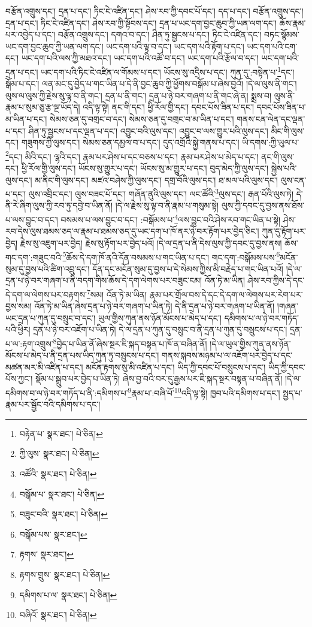 བརྩོན་འགྲུས་དང་། དྲན་པ་དང་། ཏིང་ངེ་འཛིན་དང་། ཤེས་རབ་ཀྱི་དབང་པོ་དང་། དད་པ་དང་། བརྩོན་འགྲུས་དང་། དྲན་པ་དང་། ཏིང་ངེ་འཛིན་དང་། ཤེས་རབ་ཀྱི་སྟོབས་དང་། དྲན་པ་ཡང་དག་བྱང་ཆུབ་ཀྱི་ཡན་ལག་དང་། ཆོས་རྣམ་པར་འབྱེད་པ་དང་། བརྩོན་འགྲུས་དང་། དགའ་བ་དང་། ཤིན་ཏུ་སྦྱངས་པ་དང་། ཏིང་ངེ་འཛིན་དང་། བཏང་སྙོམས་ཡང་དག་བྱང་ཆུབ་ཀྱི་ཡན་ལག་དང་། ཡང་དག་པའི་ལྟ་བ་དང་། ཡང་དག་པའི་རྟོག་པ་དང་། ཡང་དག་པའི་ངག་དང་། ཡང་དག་པའི་ལས་ཀྱི་མཐའ་དང་། ཡང་དག་པའི་འཚོ་བ་དང་། ཡང་དག་པའི་རྩོལ་བ་དང་། ཡང་དག་པའི་དྲན་པ་དང་། ཡང་དག་པའི་ཏིང་ངེ་འཛིན་ལ་གོམས་པ་དང་། ཡོངས་སུ་འདྲིས་པ་དང་། ཀུན་དུ་:བསྟེན་པ་\footnote{བརྟེན་པ་  སྣར་ཐང་།  པེ་ཅིན། }དང་། སྒོམ་པ་དང་། ལན་མང་དུ་བྱེད་པ་གང་ཡིན་པ་དེ་ནི་བྱང་ཆུབ་ཀྱི་ཕྱོགས་བསྒོམ་པ་ཞེས་བྱའོ། །དེ་ལ་ལུས་ནི་གང་། ལུས་ལ་ལུས་ཀྱི་རྗེས་སུ་ལྟ་བ་ནི་གང་། དྲན་པ་ནི་གང་། དྲན་པ་ཉེ་བར་གཞག་པ་ནི་གང་ཞེ་ན། སྨྲས་བ། ལུས་ནི་རྣམ་པ་སུམ་ཅུ་རྩ་ལྔ་ཡོད་དེ། འདི་ལྟ་སྟེ། ནང་གི་དང་། ཕྱི་རོལ་གྱི་དང་། དབང་པོས་ཟིན་པ་དང་། དབང་པོས་ཟིན་པ་མ་ཡིན་པ་དང་། སེམས་ཅན་དུ་བགྲང་བ་དང་། སེམས་ཅན་དུ་བགྲང་བ་མ་ཡིན་པ་དང་། གནས་ངན་ལེན་དང་ལྡན་པ་དང་། ཤིན་ཏུ་སྦྱངས་པ་དང་ལྡན་པ་དང་། འབྱུང་བའི་ལུས་དང་། འབྱུང་བ་ལས་གྱུར་པའི་ལུས་དང་། མིང་གི་ལུས་དང་། གཟུགས་ཀྱི་ལུས་དང་། སེམས་ཅན་དམྱལ་བ་པ་དང་། དུད་འགྲོའི་སྐྱེ་གནས་པ་དང་། ཡི་དགས་:ཀྱི་ཡུལ་པ་\footnote{ཀྱི་ལུས་  སྣར་ཐང་།  པེ་ཅིན། }དང་། མིའི་དང་། ལྷའི་དང་། རྣམ་པར་ཤེས་པ་དང་བཅས་པ་དང་། རྣམ་པར་ཤེས་པ་མེད་པ་དང་། ནང་གི་ལུས་དང་། ཕྱི་རོལ་གྱི་ལུས་དང་། ཡོངས་སུ་གྱུར་པ་དང་། ཡོངས་སུ་མ་གྱུར་པ་དང་། བུད་མེད་ཀྱི་ལུས་དང་། སྐྱེས་པའི་ལུས་དང་། མ་ནིང་གི་ལུས་དང་། མཛའ་བཤེས་ཀྱི་ལུས་དང་། དགྲ་བོའི་ལུས་དང་། ཐ་མལ་པའི་ལུས་དང་། ལུས་ངན་པ་དང་། ལུས་འབྲིང་དང་། ལུས་བཟང་པོ་དང་། གཞོན་ནུའི་ལུས་དང་། ལང་ཚོའི་\footnote{འཚོའི་  སྣར་ཐང་།  པེ་ཅིན། }ལུས་དང་། རྒན་པོའི་ལུས་ཏེ། དེ་ནི་རེ་ཞིག་ལུས་ཀྱི་རབ་ཏུ་དབྱེ་བ་ཡིན་ནོ། །དེ་ལ་རྗེས་སུ་ལྟ་བ་ནི་རྣམ་པ་གསུམ་སྟེ། ལུས་ཀྱི་དབང་དུ་བྱས་ནས་ཐོས་པ་ལས་བྱུང་བ་དང་། བསམས་པ་ལས་བྱུང་བ་དང་། :བསྒོམས་པ་\footnote{བསྒོམ་པ་  སྣར་ཐང་།  པེ་ཅིན། }ལས་བྱུང་བའི་ཤེས་རབ་གང་ཡིན་པ་སྟེ། ཤེས་རབ་དེས་ལུས་ཐམས་ཅད་ལ་རྣམ་པ་ཐམས་ཅད་དུ་ཡང་དག་པ་ཁོ་ནར་ཉེ་བར་རྟོག་པར་བྱེད་ཅིང་། ཀུན་དུ་རྟོག་པར་བྱེད། རྗེས་སུ་འཇུག་པར་བྱེད། རྗེས་སུ་རྟོག་པར་བྱེད་པའོ། །དེ་ལ་དྲན་པ་ནི་དེས་ལུས་ཀྱི་དབང་དུ་བྱས་ནས། ཆོས་གང་དག་:གཟུང་བའི་\footnote{བཟུང་བའི་  སྣར་ཐང་།  པེ་ཅིན། }ཆོས་དེ་དག་ཁོ་ནའི་དོན་བསམས་པ་གང་ཡིན་པ་དང་། གང་དག་:བསྒོམས་པས་\footnote{བསྒོམ་པས་  སྣར་ཐང་། }མངོན་སུམ་དུ་བྱས་པའི་ཚིག་འབྲུ་དང་། དོན་དང་མངོན་སུམ་དུ་བྱས་པ་དེ་སེམས་ཀྱིས་མི་བརྗེད་པ་གང་ཡིན་པའོ། །དེ་ལ་དྲན་པ་ཉེ་བར་གཞག་པ་ནི་བདག་གིས་ཆོས་དེ་དག་ལེགས་པར་བཟུང་ངམ། འོན་ཏེ་མ་ཡིན། ཤེས་རབ་ཀྱིས་དེ་དང་དེ་དག་ལ་ལེགས་པར་བརྟགས་\footnote{རྟགས་  སྣར་ཐང་། }སམ། འོན་ཏེ་མ་ཡིན། རྣམ་པར་གྲོལ་བས་དེ་དང་དེ་དག་ལ་ལེགས་པར་རེག་པར་བྱས་སམ། འོན་ཏེ་མ་ཡིན་ཞེས་དྲན་པ་ཉེ་བར་གཞག་པ་ཡིན་ཏེ། དེ་ནི་དྲན་པ་ཉེ་བར་གཞག་པ་ཡིན་ནོ། །གཞན་ཡང་དྲན་པ་ཀུན་དུ་བསྲུང་བ་དང་། ཡུལ་གྱིས་ཀུན་ནས་ཉོན་མོངས་པ་མེད་པ་དང་། དམིགས་པ་ལ་ཉེ་བར་གཏོད་པའི་ཕྱིར། དྲན་པ་ཉེ་བར་འཇོག་པ་ཡིན་ཏེ། དེ་ལ་དྲན་པ་ཀུན་དུ་བསྲུང་བ་ནི་དྲན་པ་ཀུན་དུ་བསྲུངས་པ་དང་། དྲན་པ་ལ་:རྟག་འགྲུས་\footnote{རྟགས་གྲུས་  སྣར་ཐང་།  པེ་ཅིན། }བྱེད་པ་ཡིན་ནོ་ཞེས་སྔར་ཇི་སྐད་བསྟན་པ་ཁོ་ན་བཞིན་ནོ། །དེ་ལ་ཡུལ་གྱིས་ཀུན་ནས་ཉོན་མོངས་པ་མེད་པ་ནི་དྲན་པས་ཡིད་ཀུན་ཏུ་བསྲུངས་པ་དང་། གནས་སྐབས་མཉམ་པ་ལ་འཇོག་པར་བྱེད་པ་དང་མཚན་མར་མི་འཛིན་པ་དང་། མངོན་རྟགས་སུ་མི་འཛིན་པ་དང་། ཡིད་ཀྱི་དབང་པོ་བསྲུངས་པ་དང་། ཡིད་ཀྱི་དབང་པོས་ཀྱང་། སྡོམ་པ་སྒྲུབ་པར་བྱེད་པ་ཡིན་ཏེ། ཞེས་བྱ་བའི་བར་དུ་རྒྱས་པར་ཇི་སྐད་སྔར་བསྟན་པ་བཞིན་ནོ། །དེ་ལ་དམིགས་བ་ལ་ཉེ་བར་གཏོད་པ་ནི་:དམིགས་པ་\footnote{དམིགས་པ་ལ་  སྣར་ཐང་།  པེ་ཅིན། }རྣམ་པ་:བཞི་པོ་\footnote{བཞིའོ་  སྣར་ཐང་།  པེ་ཅིན། }འདི་ལྟ་སྟེ། ཁྱབ་པའི་དམིགས་པ་དང་། སྤྱད་པ་རྣམ་པར་སྦྱོང་བའི་དམིགས་པ་དང་། 